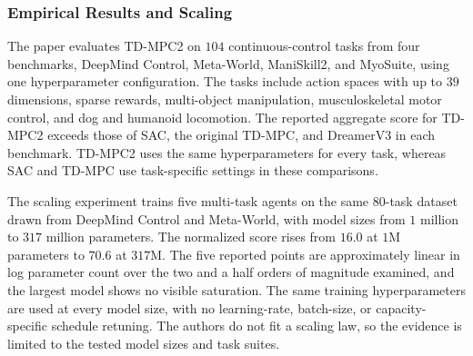 \subsubsection{Empirical Results and Scaling}
\label{section:fc_tdmpc2_empirics}

The paper evaluates TD-MPC2 on $104$ continuous-control tasks from four benchmarks, DeepMind Control, Meta-World, ManiSkill2, and MyoSuite, using one hyperparameter configuration. The tasks include action spaces with up to $39$ dimensions, sparse rewards, multi-object manipulation, musculoskeletal motor control, and dog and humanoid locomotion. The reported aggregate score for TD-MPC2 exceeds those of SAC, the original TD-MPC, and DreamerV3 in each benchmark. TD-MPC2 uses the same hyperparameters for every task, whereas SAC and TD-MPC use task-specific settings in these comparisons.

The scaling experiment trains five multi-task agents on the same $80$-task dataset drawn from DeepMind Control and Meta-World, with model sizes from $1$ million to $317$ million parameters. The normalized score rises from $16.0$ at $1$M parameters to $70.6$ at $317$M. The five reported points are approximately linear in log parameter count over the two and a half orders of magnitude examined, and the largest model shows no visible saturation. The same training hyperparameters are used at every model size, with no learning-rate, batch-size, or capacity-specific schedule retuning. The authors do not fit a scaling law, so the evidence is limited to the tested model sizes and task suites.
